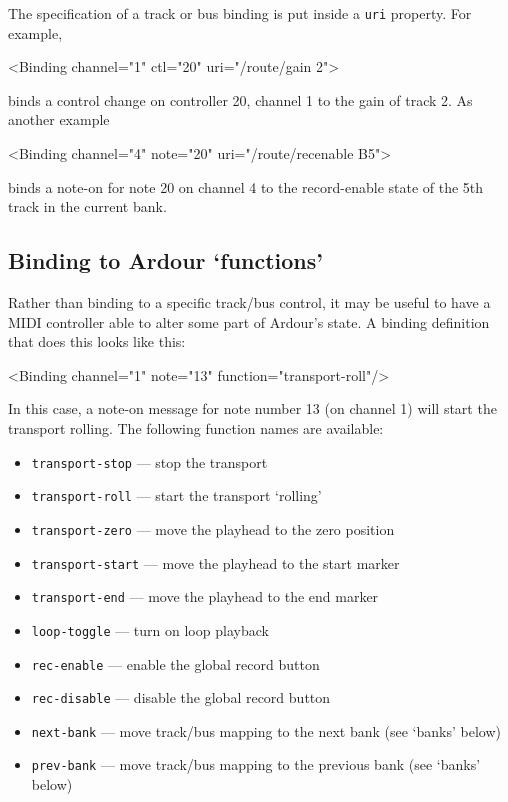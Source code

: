 \documentclass[10pt,a4paper]{book}
\begin{document}
{The specification of a track or bus binding is put inside a \texttt{uri} property.  For example,

\begin{listing}
<Binding channel="1" ctl="20" uri="/route/gain 2">
\end{listing}

binds a control change on controller 20, channel 1 to the gain of track 2.  As another example

\begin{listing}
<Binding channel="4" note="20" uri="/route/recenable B5">
\end{listing}

binds a note-on for note 20 on channel 4 to the record-enable state of
the 5th track in the current bank.



\subsection{Binding to Ardour `functions'}

Rather than binding to a specific track/bus control, it may be useful
to have a MIDI controller able to alter some part of Ardour's state. A
binding definition that does this looks like this:

\begin{listing}
<Binding channel="1" note="13" function="transport-roll"/>
\end{listing}

In this case, a note-on message for note number 13 (on channel 1) will
start the transport rolling. The following function names are
available:

\begin{itemize}
\item \texttt{transport-stop} --- stop the transport 
\item \texttt{transport-roll} --- start the transport `rolling'
\item \texttt{transport-zero} --- move the playhead to the zero position 
\item \texttt{transport-start} --- move the playhead to the start marker 
\item \texttt{transport-end} --- move the playhead to the end marker 
\item \texttt{loop-toggle} --- turn on loop playback 
\item \texttt{rec-enable} --- enable the global record button 
\item \texttt{rec-disable} --- disable the global record button 
\item \texttt{next-bank} --- move track/bus mapping to the next bank (see `banks' below) 
\item \texttt{prev-bank} --- move track/bus mapping to the previous bank (see `banks' below) 
\end{itemize}

}
\end{document}
